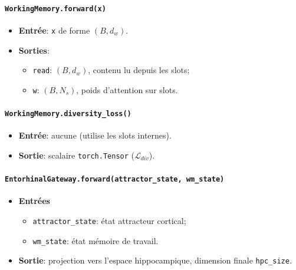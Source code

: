 \documentclass[12pt,a4paper]{article}
\begin{document}
\paragraph{\texttt{WorkingMemory.forward(x)}}
\begin{itemize}[leftmargin=*]
    \item \textbf{Entrée}: \texttt{x} de forme $(B,d_w)$.
    \item \textbf{Sorties}:
    \begin{itemize}
        \item \texttt{read}: $(B,d_w)$, contenu lu depuis les slots;
        \item \texttt{w}: $(B,N_s)$, poids d'attention sur slots.
    \end{itemize}
\end{itemize}

\paragraph{\texttt{WorkingMemory.diversity\_loss()}}
\begin{itemize}[leftmargin=*]
    \item \textbf{Entrée}: aucune (utilise les slots internes).
    \item \textbf{Sortie}: scalaire \texttt{torch.Tensor} ($\mathcal{L}_{div}$).
\end{itemize}

\paragraph{\texttt{EntorhinalGateway.forward(attractor\_state, wm\_state)}}
\begin{itemize}[leftmargin=*]
    \item \textbf{Entrées}
    \begin{itemize}
        \item \texttt{attractor\_state}: état attracteur cortical;
        \item \texttt{wm\_state}: état mémoire de travail.
    \end{itemize}
    \item \textbf{Sortie}: projection vers l'espace hippocampique, dimension finale \texttt{hpc\_size}.
\end{itemize}
\end{document}
